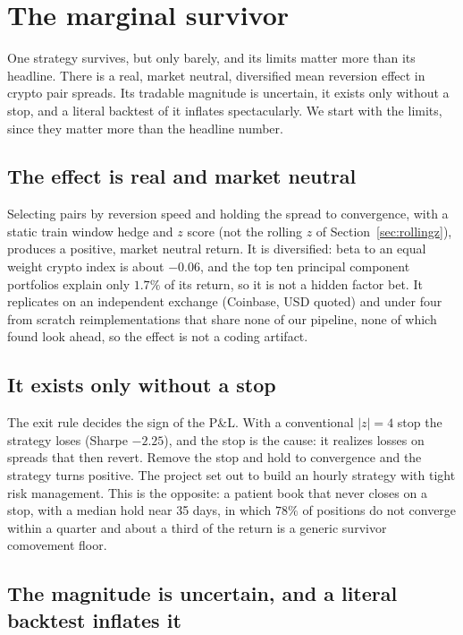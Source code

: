 \documentclass[11pt]{article}
\begin{document}
\section{The marginal survivor}
\label{sec:survivor}

One strategy survives, but only barely, and its limits matter more than its headline. There is a real, market neutral,
diversified mean reversion effect in crypto pair spreads. Its tradable magnitude is uncertain, it
exists only without a stop, and a literal backtest of it inflates spectacularly. We start with the
limits, since they matter more than the headline number.

\subsection{The effect is real and market neutral}

Selecting pairs by reversion speed and holding the spread to convergence, with a static
train window hedge and $z$ score (not the rolling $z$ of Section~\ref{sec:rollingz}), produces a
positive, market neutral return. It is diversified: beta to an equal weight crypto index is about $-0.06$,
and the top ten principal component portfolios explain only $1.7\%$ of its return, so it is not a
hidden factor bet. It replicates on an independent exchange (Coinbase, USD quoted) and under four
from scratch reimplementations that share none of our pipeline, none of which found look ahead,
so the effect is not a coding artifact.

\subsection{It exists only without a stop}

The exit rule decides the sign of the P\&L. With a conventional $|z| = 4$ stop the strategy loses
(Sharpe $-2.25$), and the stop is the cause: it realizes losses on spreads that then revert.
Remove the stop and hold to convergence and the strategy turns positive. The project set out to
build an hourly strategy with tight risk management. This is the opposite: a patient book that
never closes on a stop, with a median hold near 35 days, in which $78\%$ of positions do not converge within a quarter and
about a third of the return is a generic survivor comovement floor.

\subsection{The magnitude is uncertain, and a literal backtest inflates it}
\end{document}
